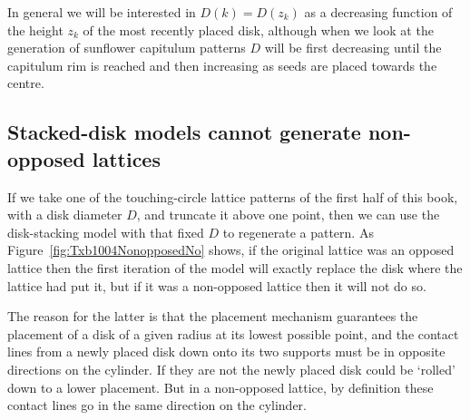 In general we will be interested in $D(k)=D(z_k)$ as a decreasing function of the height $z_k$ of the most recently placed disk, although when we look at the generation of sunflower capitulum patterns $D$ will be first decreasing until the capitulum rim is reached and then increasing as seeds are placed towards the centre. 


\subsection{Stacked-disk models cannot generate non-opposed lattices}
If we take one of the touching-circle lattice patterns of the first half of this book, with a disk diameter $D$, and truncate it above one point, then
we can use the disk-stacking model with that fixed $D$ to regenerate a pattern. As Figure~\ref{fig:Txb1004NonopposedNo} shows, if the original lattice was an opposed lattice then the first iteration of the model will exactly replace the disk where the lattice had put it, but if it was a non-opposed lattice then it will not do so.


The reason for the latter is that the placement mechanism guarantees the placement of a disk of a given radius at its lowest possible point, and the contact lines from a newly placed disk down onto its two supports must be in opposite directions on the cylinder. If they are not the newly placed disk could be `rolled' down to a lower placement. But in a non-opposed lattice, by definition these contact lines go in the same direction on the cylinder.


